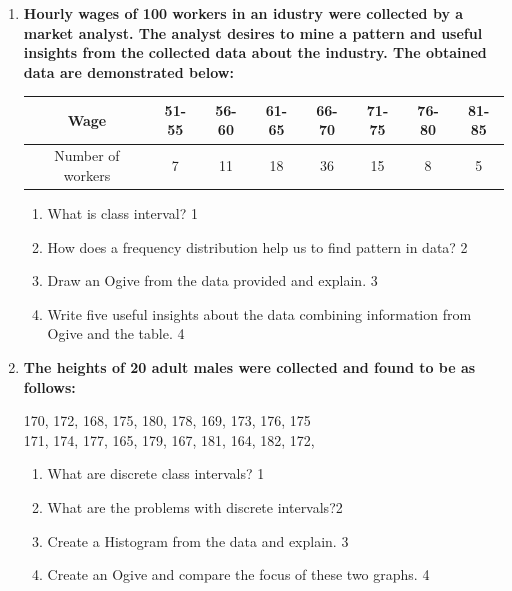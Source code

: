 \documentclass[a4paper,oneside]{book}
\begin{document}
\begin{enumerate}
  \begin{enumerate}
    \item  
	Draw an Ogive from the data provided and explain. \hfill 3
    \item
	Write five useful insights about the data combining information from 
	the Ogive and the table. \hfill 4
  \end{enumerate}
  
       \item
	  \textbf{Hourly wages of 100 workers in an idustry were collected by a 
	  market analyst. The analyst desires to mine a pattern and useful insights 
	  from the collected data about the industry. The obtained data are 
	  demonstrated below:}
	  
	  \begin{table}[h]
	  \centering
\begin{tabular}{c|c|c|c|c|c|c|c}
Wage              & 51-55 & 56-60 & 61-65 & 66-70 & 71-75 & 76-80 & 81-85 \\ \hline
Number of workers & 7     & 11    & 18    & 36    & 15    & 8     & 5    
\end{tabular}
\end{table}

  \begin{enumerate}    \item
	What is class interval? \hfill 1
    \item
	How does a frequency distribution help us to find pattern in data? \hfill 2
    \item  
	Draw an Ogive from the data provided and explain. \hfill 3
    \item
	Write five useful insights about the data combining information from Ogive and the table. \hfill 4
  \end{enumerate}
  
   \item
	  \textbf{The heights of 20 adult males were collected and found to be as follows:}
	  \begin{center}
	  170, 172, 168, 175, 180, 178, 169, 173, 176, 175 \\
	  171, 174, 177, 165, 179, 167, 181, 164, 182, 172,  \\
	  \end{center}
  
  \begin{enumerate}
    \item
	What are discrete class intervals? \hfill 1
    \item
	What are the problems with discrete intervals?\hfill 2
    \item  
	Create a Histogram from the data  and explain. \hfill 3
    \item
	Create an Ogive and compare the focus of these two graphs. \hfill 4
  \end{enumerate}
  

\end{enumerate}
\end{document}
